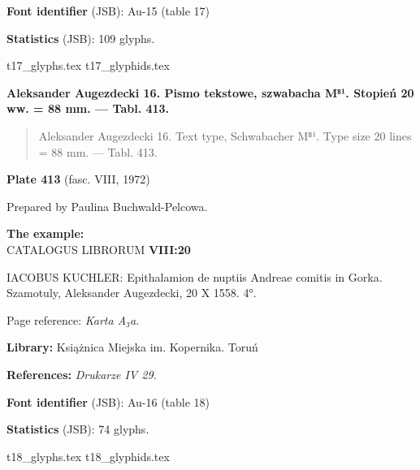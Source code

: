 \documentclass[12pt]{article}
\newcommand{\bg}{\begingl}
\newcommand{\pismoPL}[1]{{\relsize{2}\Junicode\textbf{#1}}}
\newcommand{\pismoEN}[1]{{\relsize{1}\Junicode\begin{quote}#1\end{quote}}}
\newcommand{\plate}[3]{\textbf{Plate #1} (fasc. #2, #3)}
\newcommand{\exampleBib}[1]{{\relsize{2}\Junicode\textbf{The
      example:}\\[2ex] CATALOGUS LIBRORUM \textbf{#1}}}
\newcommand{\exampleDesc}[1]{{\relsize{0}\Junicode#1}}
\newcommand{\exampleDig}[1]{{\relsize{0}\Junicode \textbf{Digitization(s) [JSB]:} #1}}
\newcommand{\exampleLib}[1]{{\relsize{0}\Junicode \textbf{Library:} #1}}
\newcommand{\examplePL}[1]{}
\newcommand{\exampleEN}[1]{}
\newcommand{\fontID}[2]{{\relsize{1}\Junicode\textbf{Font identifier} (JSB): #1 (table #2)}}
\newcommand{\fontstat}[1]{{\relsize{1}\Junicode\textbf{Statistics} (JSB): #1 glyphs.}}
\newcommand{\exampleRef}[1]{{\relsize{0}\Junicode \textbf{References:} #1}}
\newcommand{\examplePage}[1]{{Page reference: \relsize{0}\Junicode#1}}
\begin{document}
\bigskip

\fontID{Au-15}{17}

\fontstat{109}

  {t17_glyphs.tex}
  {t17_glyphids.tex}


 \newpage




\pismoPL{Aleksander Augezdecki 16. Pismo tekstowe, szwabacha M⁸¹. Stopień 20 ww. = 88 mm. — Tabl. 413.}

\pismoEN{Aleksander Augezdecki 16. Text type, Schwabacher M⁸¹. Type size 20 lines = 88 mm. — Tabl. 413.}
\medskip

\plate{413}{VIII}{1972}

Prepared by Paulina Buchwald-Pelcowa.

\bigskip

 \exampleBib{VIII:20}

\bigskip
\exampleDesc{IACOBUS KUCHLER: Epithalamion de nuptiis Andreae comitis in Gorka.
Szamotuly, Aleksander Augezdecki, 20 X 1558. 4°.}

\medskip
\examplePage{\textit{Karta A₃a.}}

  \bigskip
\exampleLib{Książnica Miejska im. Kopernika. Toruń}

\bigskip
\exampleRef{\textit{Drukarze IV 29.}}


\medskip

    \examplePL{Pismo 16: tekst i zestaw.}

    \medskip

    \exampleEN{Font 16. A text and the font table.}


\bigskip


\fontID{Au-16}{18}

\fontstat{74}

  {t18_glyphs.tex}
  {t18_glyphids.tex}
\end{document}
